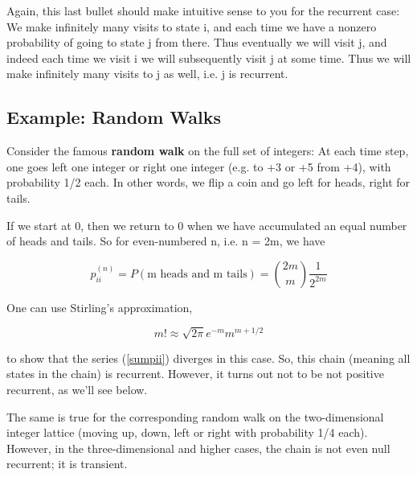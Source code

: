 Again, this last bullet should make intuitive sense to you for the
recurrent case: We make infinitely many visits to state i, and each time
we have a nonzero probability of going to state j from there.  Thus
eventually we will visit j, and indeed each time we visit i we will
subsequently visit j at some time.  Thus we will make infinitely many
visits to j as well, i.e. j is recurrent.

\subsection{Example:  Random Walks}

Consider the famous \textbf{random walk} on the full set of
integers: At each time step, one goes left one integer or right one
integer (e.g.  to +3 or +5 from +4), with probability 1/2 each.  In
other words, we flip a coin and go left for heads, right for tails.

If we start at 0, then we return to 0 when we have accumulated an equal
number of heads and tails.  So for even-numbered n, i.e. n = 2m, we have

\begin{equation}
p_{ii}^{(n)} =  P(\textrm {m heads and m tails}) =
\binom{2m}{m} \frac{1}{2^{2m}}
\end{equation}

One can use Stirling's approximation,

\begin{equation}
m! \approx \sqrt{2 \pi} e^{-m} m^{m+1/2}
\end{equation}

to show that the series (\ref{sumpii}) diverges in this case.  So, this
chain (meaning all states in the chain) is recurrent.  However, it turns
out not to be not positive recurrent, as we'll see below. 

The same is true for the corresponding random walk on the
two-dimensional integer lattice (moving up, down, left or right with
probability 1/4 each). However, in the three-dimensional and higher
cases, the chain is not even null recurrent; it is transient.  

% 
% 


